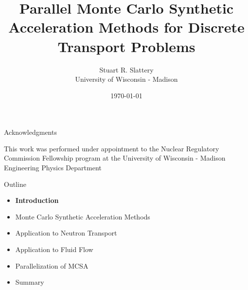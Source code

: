 \documentclass{beamer}
\author{Stuart R. Slattery\\ University of Wisconsin - Madison}
\date{\today}
\title{Parallel Monte Carlo Synthetic Acceleration Methods for
  Discrete Transport Problems}
\begin{document}
\maketitle

\begin{frame}{Acknowledgments}

  This work was performed under appointment to the Nuclear Regulatory
  Commission Fellowship program at the University of Wisconsin - Madison
  Engineering Physics Department

\end{frame}

\begin{frame}{Outline}

  \begin{itemize}
  \item \textbf{Introduction}
    \bigskip
  \item Monte Carlo Synthetic Acceleration Methods
    \bigskip
  \item Application to Neutron Transport
    \bigskip
  \item Application to Fluid Flow
    \bigskip
  \item Parallelization of MCSA
    \bigskip
  \item Summary
  \end{itemize}

\end{frame}
\end{document}
